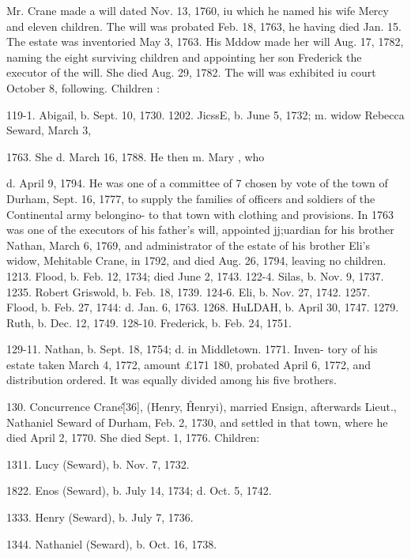 \documentclass{book}
\begin{document}
Mr. Crane made a will dated Nov. 13, 1760, iu which he named 
his wife Mercy and eleven children. The will was probated Feb. 
18, 1763, he having died Jan. 15. The estate was inventoried 
May 3, 1763. His Mddow made her will Aug. 17, 1782, naming 
the eight surviving children and appointing her son Frederick the 
executor of the will. She died Aug. 29, 1782. The will was 
exhibited iu court October 8, following. 
Children : 

119-1. Abigail, b. Sept. 10, 1730. 
1202. JicssE, b. June 5, 1732; m. widow Rebecca Seward, March 3, 

1763. She d. March 16, 1788. He then m. Mary , who 

d. April 9, 1794. He was one of a committee of 7 chosen 
by vote of the town of Durham, Sept. 16, 1777, to supply 
the families of officers and soldiers of the Continental 
army belongino- to that town with clothing and provisions. 
In 1763 was one of the executors of his father's will, 
appointed jj;uardian for his brother Nathan, March 6, 1769, 
and administrator of the estate of his brother Eli's widow, 
Mehitable Crane, in 1792, and died Aug. 26, 1794, leaving 
no children. 
1213. Flood, b. Feb. 12, 1734; died June 2, 1743. 
122-4. Silas, b. Nov. 9, 1737. 
1235. Robert Griswold, b. Feb. 18, 1739. 
124-6. Eli, b. Nov. 27, 1742. 
1257. Flood, b. Feb. 27, 1744: d. Jan. 6, 1763. 
1268. HuLDAH, b. April 30, 1747. 
1279. Ruth, b. Dec. 12, 1749. 
128-10. Frederick, b. Feb. 24, 1751. 

129-11. Nathan, b. Sept. 18, 1754; d. in Middletown. 1771. Inven- 
tory of his estate taken March 4, 1772, amount £171  180, 
probated April 6, 1772, and distribution ordered. It was 
equally divided among his five brothers. 

130. Concurrence Crane\^ [36], (Henry, \^ Henryi), married 
Ensign, afterwards Lieut., Nathaniel Seward of Durham, Feb. 
2, 1730, and settled in that town, where he died April 2, 1770. 
She died Sept. 1, 1776. Children: 

1311. Lucy (Seward), b. Nov. 7, 1732. 

1822. Enos (Seward), b. July 14, 1734; d. Oct. 5, 1742. 

1333. Henry (Seward), b. July 7, 1736. 

1344. Nathaniel (Seward), b. Oct. 16, 1738. 
\end{document}
